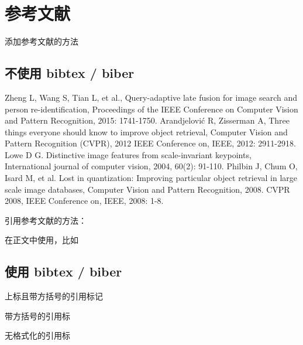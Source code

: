 \documentclass[UTF8]{ctexart}
\begin{document}
    \section{参考文献}
    添加参考文献的方法

    \subsection{不使用 bibtex / biber }
    \begin{thebibliography}{99}  
        Zheng L, Wang S, Tian L, et al., Query-adaptive late fusion for image search and person re-identification, Proceedings of the IEEE Conference on Computer Vision and Pattern Recognition, 2015: 1741-1750.  
        Arandjelović R, Zisserman A, Three things everyone should know to improve object retrieval, Computer Vision and Pattern Recognition (CVPR), 2012 IEEE Conference on, IEEE, 2012: 2911-2918.  
        Lowe D G. Distinctive image features from scale-invariant keypoints, International journal of computer vision, 2004, 60(2): 91-110.  
        Philbin J, Chum O, Isard M, et al. Lost in quantization: Improving particular object retrieval in large scale image databases, Computer Vision and Pattern Recognition, 2008. CVPR 2008, IEEE Conference on, IEEE, 2008: 1-8.  
    \end{thebibliography}

    引用参考文献的方法：

    在正文中使用\cite{ref1}，比如\cite{ref1, ref4}
    \subsection{使用 bibtex / biber }
    上标且带方括号的引用标记 \cite{greenwade93}

    带方括号的引用标\parencite{greenwade93}

    无格式化的引用标\supercite{yerlanova2021high}

    \printbibliography
\end{document}

